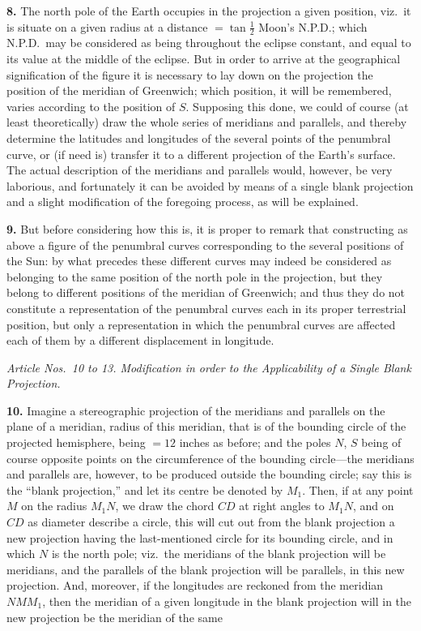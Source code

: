 \documentclass[11pt]{article}
\begin{document}
\medskip

\textbf{8.} The north pole of the Earth occupies in the projection a
given position, viz.\ it is situate on a given radius at a distance
$=\tan\tfrac{1}{2}$ Moon's N.P.D.; which N.P.D.\ may be considered as
being throughout the eclipse constant, and equal to its value at the
middle of the eclipse. But in order to arrive at the geographical
signification of the figure it is necessary to lay down on the projection
the position of the meridian of Greenwich; which position, it will be
remembered, varies according to the position of $S$. Supposing this done,
we could of course (at least theoretically) draw the whole series of
meridians and parallels, and thereby determine the latitudes and
longitudes of the several points of the penumbral curve, or (if need is)
transfer it to a different projection of the Earth's surface. The actual
description of the meridians and parallels would, however, be very
laborious, and fortunately it can be avoided by means of a single blank
projection and a slight modification of the foregoing process, as will be
explained.

\medskip

\textbf{9.} But before considering how this is, it is proper to remark
that constructing as above a figure of the penumbral curves corresponding
to the several positions of the Sun: by what precedes these different
curves may indeed be considered as belonging to the same position of the
north pole in the projection, but they belong to different positions of
the meridian of Greenwich; and thus they do not constitute a
representation of the penumbral curves each in its proper terrestrial
position, but only a representation in which the penumbral curves are
affected each of them by a different displacement in longitude.

\medskip

\begin{center}
\textit{Article Nos.\ 10 to 13. Modification in order to the Applicability of
a Single Blank Projection.}
\end{center}

\medskip

\textbf{10.} Imagine a stereographic projection of the meridians and
parallels on the plane of a meridian, radius of this meridian, that is of
the bounding circle of the projected hemisphere, being $=12$ inches as
before; and the poles $N$, $S$ being of course opposite points on the
circumference of the bounding circle---the meridians and parallels are,
however, to be produced outside the bounding circle; say this is the
``blank projection,'' and let its centre be denoted by $M_{1}$. Then, if
at any point $M$ on the radius $M_{1}N$, we draw the chord $CD$ at right
angles to $M_{1}N$, and on $CD$ as diameter describe a circle, this will
cut out from the blank projection a new projection having the
last-mentioned circle for its bounding circle, and in which $N$ is the
north pole; viz.\ the meridians of the blank projection will be
meridians, and the parallels of the blank projection will be parallels,
in this new projection. And, moreover, if the longitudes are reckoned
from the meridian $NMM_{1}$, then the meridian of a given longitude in
the blank projection will in the new projection be the meridian of the
same
\end{document}
